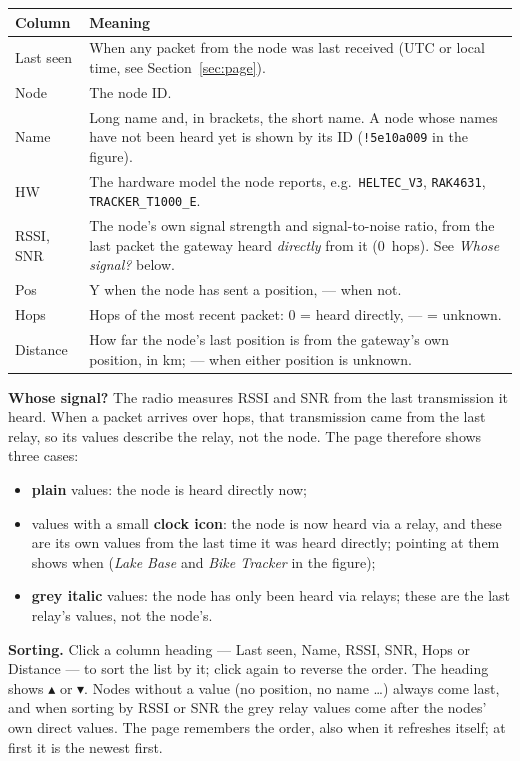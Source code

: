 \documentclass[10pt,a4paper]{article}
\newcommand{\ui}[1]{\textsf{\small #1}}            %
\newcommand{\lead}[1]{\textbf{#1}\enspace}           %
\newcommand{\cmd}[1]{\texttt{#1}}
\begin{document}
\begin{tabularx}{\textwidth}{@{}lX@{}}
\toprule
Column & Meaning \\
\midrule
Last seen & When any packet from the node was last received (UTC or local time, see Section~\ref{sec:page}). \\
Node & The node ID. \\
Name & Long name and, in brackets, the short name. A node whose names have not been heard yet is shown by its ID (\cmd{!5e10a009} in the figure). \\
HW & The hardware model the node reports, e.g.\ \cmd{HELTEC\_V3}, \cmd{RAK4631}, \cmd{TRACKER\_T1000\_E}. \\
RSSI, SNR & The node's own signal strength and signal-to-noise ratio, from the last packet the gateway heard \emph{directly} from it (0~hops). See \emph{Whose signal?} below. \\
Pos & \textcolor{ackY}{Y} when the node has sent a position, --- when not. \\
Hops & Hops of the most recent packet: 0 = heard directly, --- = unknown. \\
Distance & How far the node's last position is from the gateway's own position, in km; --- when either position is unknown. \\
\bottomrule
\end{tabularx}

\lead{Whose signal?} The radio measures RSSI and SNR from the last transmission it heard. When a packet arrives over hops, that transmission came from the last relay, so its values describe the relay, not the node. The page therefore shows three cases:
\begin{itemize}[leftmargin=1.2em]
\item \textbf{plain} values: the node is heard directly now;
\item values with a small \textbf{clock icon}: the node is now heard via a relay, and these are its own values from the last time it was heard directly; pointing at them shows when (\emph{Lake Base} and \emph{Bike Tracker} in the figure);
\item \textbf{grey italic} values: the node has only been heard via relays; these are the last relay's values, not the node's.
\end{itemize}

\lead{Sorting.} Click a column heading --- \ui{Last seen}, \ui{Name}, \ui{RSSI}, \ui{SNR}, \ui{Hops} or \ui{Distance} --- to sort the list by it; click again to reverse the order. The heading shows $\blacktriangle$ or $\blacktriangledown$. Nodes without a value (no position, no name \dots) always come last, and when sorting by RSSI or SNR the grey relay values come after the nodes' own direct values. The page remembers the order, also when it refreshes itself; at first it is the newest first.
\end{document}
